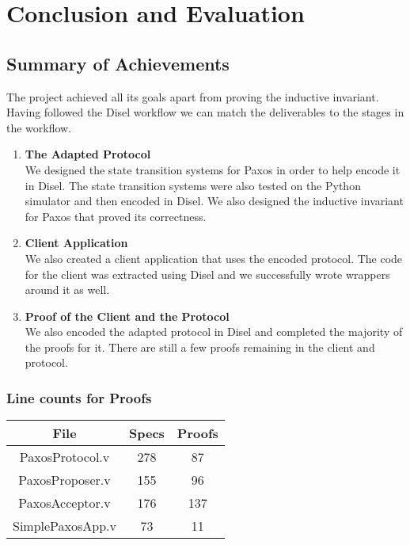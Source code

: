 \chapter{Conclusion and Evaluation}

\section{Summary of Achievements}
The project achieved all its goals apart from proving the inductive invariant.
Having followed the Disel workflow we can match the deliverables to the
stages in the workflow.
\begin{enumerate}
  \item \textbf{The Adapted Protocol} \\
    We designed the state transition systems for Paxos in order to help encode it in
    Disel. The state transition systems were also tested on the Python simulator
    and then encoded in Disel. We also designed the inductive invariant for Paxos
    that proved its correctness.
  \item \textbf{Client Application} \\
    We also created a client application that uses the encoded protocol. The
    code for the client was extracted using Disel and we successfully wrote
    wrappers around it as well.
  \item \textbf{Proof of the Client and the Protocol} \\
    We also encoded the adapted protocol in Disel and completed the majority
    of the proofs for it. There are still a few proofs remaining in the
    client and protocol.
\end{enumerate}

\subsection{Line counts for Proofs}
\begin{center}
\begin{tabular}{ |c|c|c| }
\hline
File & Specs & Proofs\\
\hline
PaxosProtocol.v & 278 & 87 \\
PaxosProposer.v & 155 & 96 \\
PaxosAcceptor.v & 176 & 137 \\
SimplePaxosApp.v & 73 & 11 \\
\hline
\end{tabular}
\end{center}

